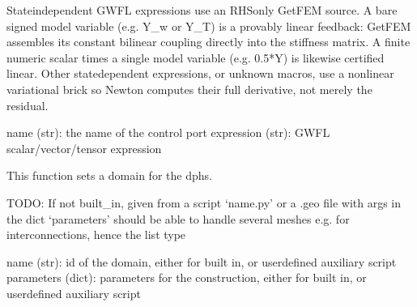 \documentclass[letterpaper,10pt,english]{sphinxmanual}
\begin{document}
\begin{fulllineitems}
\begin{fulllineitems}
\sphinxAtStartPar
State\sphinxhyphen{}independent GWFL expressions use an RHS\sphinxhyphen{}only GetFEM source.
A bare signed model variable (e.g. Y\_w or \sphinxhyphen{}Y\_T) is
a provably linear feedback: GetFEM assembles its constant
bilinear coupling directly into the stiffness matrix.
A finite numeric scalar times a single model variable
(e.g. \sphinxhyphen{}0.5*Y) is likewise certified linear. Other
state\sphinxhyphen{}dependent expressions, or unknown macros,
use a nonlinear variational brick so Newton computes
their full derivative, not merely the residual.
\begin{description}
\sphinxAtStartPar
name (str): the name of the control port
expression (str): GWFL scalar/vector/tensor expression

\end{description}

\end{fulllineitems}


\begin{fulllineitems}
\label{\detokenize{scrimp:scrimp.dphs.DPHS.set_domain}}
\pysigstartsignatures
\pysiglinewithargsret
{}
{}
{}
\pysigstopsignatures
\sphinxAtStartPar
This function sets a domain for the dphs.

\sphinxAtStartPar
TODO: If not built\_in, given from a script ‘name.py’ or a .geo file with args in the dict ‘parameters’ should be able to handle several meshes e.g. for interconnections, hence the list type
\begin{description}
\sphinxAtStartPar
name (str): id of the domain, either for built in, or user\sphinxhyphen{}defined auxiliary script
parameters (dict): parameters for the construction, either for built in, or user\sphinxhyphen{}defined auxiliary script

\end{description}

\end{fulllineitems}



\end{fulllineitems}
\end{document}
